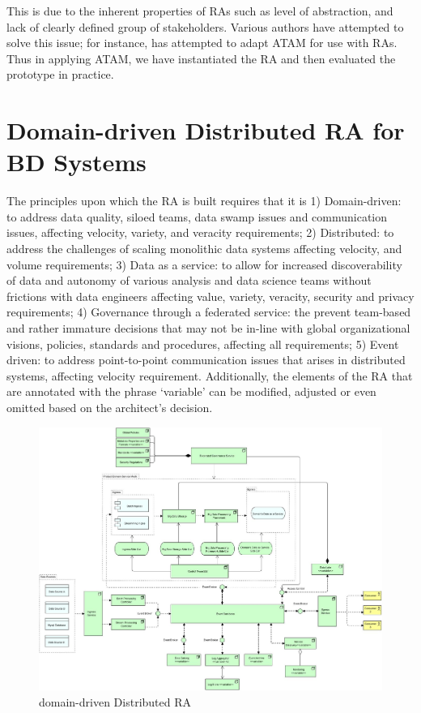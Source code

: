 \documentclass[a4paper,11pt]{article}
\begin{document}
\begin{description}
This is due to the inherent properties of RAs such as level of abstraction, and lack of clearly defined group of stakeholders. Various authors have attempted to solve this issue; for instance, \citet{angelov2008towards} has attempted to adapt ATAM for use with RAs. Thus in applying ATAM, we have instantiated the RA and then evaluated the prototype in practice. 
\end{description}


\section{Domain-driven Distributed RA for BD Systems}
\nobreak{}
The principles upon which the RA is built requires that it is 1) Domain-driven: to address data quality, siloed teams, data swamp issues and communication issues, affecting velocity, variety, and veracity requirements; 2) Distributed: to address the challenges of scaling monolithic data systems affecting velocity, and volume requirements; 3) Data as a service: to allow for increased discoverability of data and autonomy of various analysis and data science teams without frictions with data engineers affecting value, variety, veracity, security and privacy requirements; 4) Governance through a federated service: the prevent team-based and rather immature decisions that may not be in-line with global organizational visions, policies, standards and procedures, affecting all requirements; 5) Event driven: to address point-to-point communication issues that arises in distributed systems, affecting velocity requirement. Additionally, the elements of the RA that are annotated with the phrase `variable' can be modified, adjusted or even omitted based on the architect's decision. 


\begin{figure}[h!t]
    \includegraphics[width=\linewidth]{media/Metamycelium.jpg}
    \caption{domain-driven Distributed RA}
    \label{fig-RA}
\end{figure}
\end{document}
